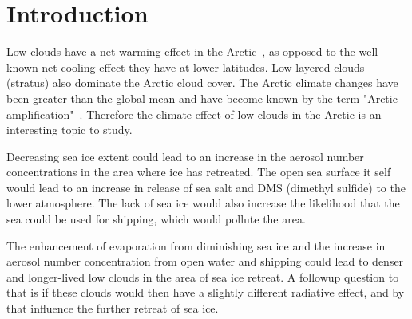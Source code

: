 \chapter{Introduction}
\label{chap:introduction}
Low clouds have a net warming effect in the Arctic~\citep{Intrieri2002a}, as opposed to the well known net cooling effect they have at lower latitudes. Low layered clouds (stratus) also dominate the Arctic cloud cover. The Arctic climate changes have been greater than the global mean and have become known by the term "Arctic amplification"~\citep{Graversen2008}. Therefore the climate effect of low clouds in the Arctic is an interesting topic to study.

Decreasing sea ice extent could lead to an increase in the aerosol number concentrations in the area where ice has retreated. The open sea surface it self would lead to an increase in release of sea salt and DMS (dimethyl sulfide) to the lower atmosphere. The lack of sea ice would also increase the likelihood that the sea could be used for shipping, which would pollute the area.

The enhancement of evaporation from diminishing sea ice and the increase in aerosol number concentration from open water and shipping could lead to denser and longer-lived low clouds in the area of sea ice retreat. A followup question to that is if these clouds would then have a slightly different radiative effect, and by that influence the further retreat of sea ice.


 


